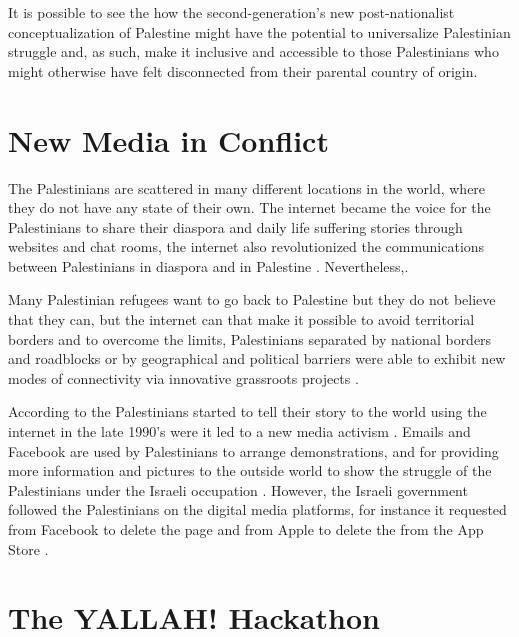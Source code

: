 It is possible to see the how the second-generation’s new post-nationalist conceptualization of Palestine might have the potential to universalize Palestinian 
struggle and, as such, make it inclusive and accessible to those Palestinians who might 
otherwise have felt disconnected from their parental country of origin. 

\section{New Media in Conflict}
The Palestinians are scattered in many different locations in the world, where they do not have any state of their own. The internet became the voice for the Palestinians to share their diaspora and daily life suffering stories through websites and chat rooms, the internet also revolutionized the communications between Palestinians in diaspora and in Palestine \citep{Ogunyemi2015, Aouragh2011}. Nevertheless,\cite [p.1]{Aouragh2011}.

Many Palestinian refugees want to go back to Palestine but they do not believe that they can, but the internet can that make it possible  
to avoid territorial borders and to overcome the limits, Palestinians separated by national borders and roadblocks or by geographical and political barriers were able to exhibit new modes of connectivity via innovative grassroots projects \citep{Aouragh2011}. 

According to \cite{Wulf2013} the Palestinians started to tell their story to the world using the internet in the late 1990's were it led to a new media activism \citep{Wulf2013}. Emails and Facebook are used by Palestinians to arrange demonstrations, and for providing more information and pictures to the outside world to show the struggle of the Palestinians under the Israeli occupation \citep{Wulf2013}. However, the Israeli government followed the Palestinians on the digital media platforms, for instance it requested from Facebook to delete the page  and from Apple to delete the  from the App Store \citep{Wulf2013}.      



\section{The YALLAH! Hackathon}

